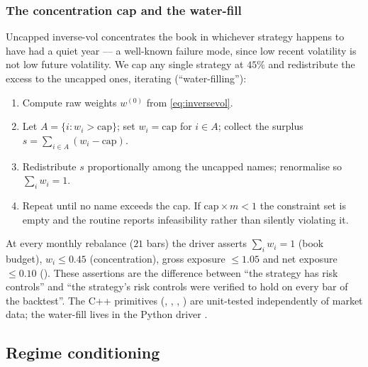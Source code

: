 \subsubsection{The concentration cap and the water-fill}

Uncapped inverse-vol concentrates the book in whichever strategy happens to have had a
quiet year --- a well-known failure mode, since low recent volatility is not low future
volatility. We cap any single strategy at $45\%$ and redistribute the excess to the
uncapped ones, iterating (``water-filling''):

\begin{enumerate}
  \item Compute raw weights $w^{(0)}$ from \eqref{eq:inversevol}.
  \item Let $A=\{i: w_i > \text{cap}\}$; set $w_i=\text{cap}$ for $i\in A$; collect the
    surplus $s=\sum_{i\in A}(w_i-\text{cap})$.
  \item Redistribute $s$ proportionally among the uncapped names; renormalise so
    $\sum_i w_i = 1$.
  \item Repeat until no name exceeds the cap. If $\text{cap}\times m<1$ the constraint set
    is empty and the routine reports infeasibility rather than silently violating it.
\end{enumerate}

At every monthly rebalance ($21$ bars) the driver asserts $\sum_i w_i=1$ (book budget),
$w_i\le0.45$ (concentration), gross exposure $\le1.05$ and net exposure $\le0.10$
(). These assertions are the difference between ``the strategy
has risk controls'' and ``the strategy's risk controls were verified to hold on every bar
of the backtest''. The C++ primitives (,
, , ) are unit-tested
independently of market data; the water-fill lives in the Python driver
.

\subsection{Regime conditioning}
\label{sec:bt:regimes}

